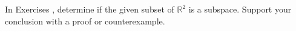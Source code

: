 {\noin In Exercises }
{, determine if the given subset of $\mathbb{R}^2$ is a subspace. Support your conclusion with a proof or counterexample.}
